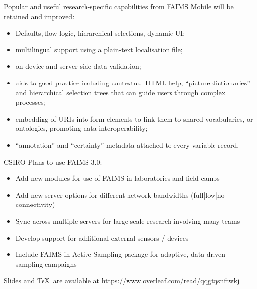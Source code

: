 \documentclass[unknownkeysallowed,usepdftitle=false, parskip=full, t]{beamer}
\newcommand{\secvariable}{nothing}
\newcommand{\mysection}[1]{\renewcommand{\secvariable}{#1}
}
\begin{document}
\begin{frame}
\parbox{\linewidth}{
Popular and useful research-specific capabilities from FAIMS Mobile will be retained and improved: 

\begin{itemize}
\item Defaults, flow logic, hierarchical selections, dynamic UI;
\item multilingual support using a plain-text localisation file;
\item on-device and server-side data validation;
\item aids to good practice including contextual HTML help, ``picture dictionaries'' and hierarchical selection trees that can guide users through complex processes;
\item embedding of URIs into form elements to link them to shared vocabularies, or ontologies, promoting data interoperability;
\item ``annotation'' and ``certainty'' metadata attached to every variable record.
\end{itemize}
}
\end{frame}

\mysection{CSIRO}
\begin{frame}\label{\secvariable}
\parbox{\linewidth}{
CSIRO Plans to use FAIMS 3.0:

\begin{itemize}
\item Add new modules for use of FAIMS in laboratories and field camps
\item Add new server options for different network bandwidths (full|low|no connectivity)
\item Sync across multiple servers for large-scale research involving many teams
\item Develop support for additional external sensors / devices
\item Include FAIMS in Active Sampling package for adaptive, data-driven sampling campaigns
\end{itemize}
}
\end{frame}

\begin{frame}[t]
\parbox{\linewidth}{%
\scriptsize
\nocite{Ballsun-Stanton2018-zd, Sobotkova2016-mx, Ross2015-ph, Ross2013-hi, Sobotkova2015-gm}

\vskip-0.35cm
 

Slides and \TeX~are available at \url{https://www.overleaf.com/read/qqgtqsnftwkj}
}
\end{frame}
\end{document}

